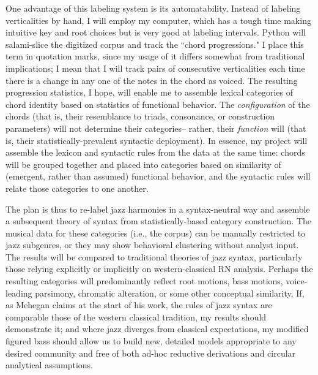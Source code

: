 One advantage of this labeling system is its automatability.  Instead of labeling verticalities by hand, I will employ my computer, which has a tough time making intuitive key and root choices but is very good at labeling intervals.  Python will salami-slice the digitized corpus and track the ``chord progressions."  I place this term in quotation marks, since my usage of it differs somewhat from traditional implications; I mean that I will track pairs of consecutive verticalities each time there is a change in any one of the notes in the chord as voiced.  The resulting progression statistics, I hope, will enable me to assemble lexical categories of chord identity based on statistics of functional behavior.  The \emph{configuration} of the chords (that is, their resemblance to triads, consonance, or construction parameters) will not determine their categories-- rather, their \emph{function} will (that is, their statistically-prevalent syntactic deployment).  In essence, my project will assemble the lexicon and syntactic rules from the data at the same time: chords will be grouped together and placed into categories based on similarity of (emergent, rather than assumed) functional behavior, and the syntactic rules will relate those categories to one another.  

The plan is thus to re-label jazz harmonies in a syntax-neutral way and assemble a subsequent theory of syntax from statistically-based category construction.  The musical data for these categories (i.e., the corpus) can be manually restricted to jazz subgenres, or they may show behavioral clustering without analyst input.  The results will be compared to traditional theories of jazz syntax, particularly those relying explicitly or implicitly on western-classical RN analysis.  Perhaps the resulting categories will predominantly reflect root motions, bass motions, voice-leading parsimony, chromatic alteration, or some other conceptual similarity.  If, as Mehegan claims at the start of his work, the rules of jazz syntax are comparable those of the western classical tradition, my results should demonstrate it; and where jazz diverges from classical expectations, my modified figured bass should allow us to build new, detailed models appropriate to any desired community and free of both ad-hoc reductive derivations and circular analytical assumptions.

